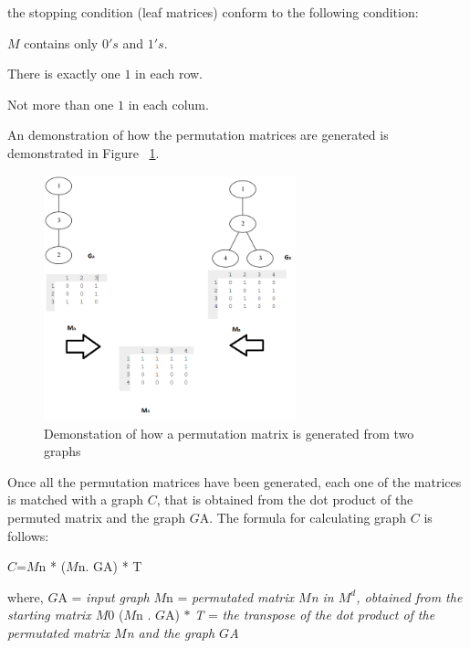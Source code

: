 the stopping condition (leaf matrices) conform to the following condition:
\begin{myEnumerate}
\item $M$ contains only $0's$ and $1's$.
\item There is exactly one $1$ in each row.
\item Not more than one $1$ in each colum.
\end{myEnumerate}
An demonstration of how the permutation matrices are generated is demonstrated in Figure ~\ref{fig:permutationmatrix}.
\begin{figure}[H]
  \begin{center}
      \includegraphics[width=0.65\textwidth]{stratMatrix}
  \end{center}    
  \caption{Demonstation of how a permutation matrix is generated from two graphs} 
  \label{fig:permutationmatrix}
\end{figure} 
Once all the permutation matrices have been generated, each one of the matrices is matched with a graph $C$, that is obtained from the dot product of the permuted matrix and the graph $G${\tiny A}.
The formula for calculating graph $C$ is follows:
\begin{myEnumerate}
  \item $C$=$M${\tiny n} * ($M${\tiny n}. G{\tiny A}) * T
\end{myEnumerate}
  where,\newline
$G${\tiny A} = \textit{input graph} \newline
$M${\tiny n} = \textit{permutated matrix $M${\tiny n} in $M^d$, obtained from the starting matrix $M0$} \newline
($M${\tiny n} . $G${\tiny A}) $ * $ \textit{T} = \textit{the transpose of the dot product of the permutated matrix $M${\tiny n} and the graph $G${\tiny A}} \newline\newline 
